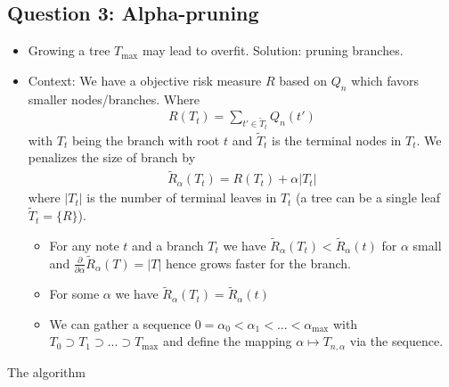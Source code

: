 \documentclass[a4paper,12pt,openany]{book}
\providecommand{\tightlist}{%
 \setlength{\itemsep}{0pt}\setlength{\parskip}{0pt}}
\begin{document}
\hypertarget{question-3-alpha-pruning}{%
\subsection{Question 3: Alpha-pruning}\label{question-3-alpha-pruning}}

\begin{itemize}
\tightlist
\item
  Growing a tree \(T_{\max}\) may lead to overfit. Solution: pruning branches.
\item
  Context: We have a objective risk measure \(R\) based on \(Q_n\) which favors smaller nodes/branches. Where
  \begin{align*}
    R(T_t)=\sum_{t'\in \tilde T_t}Q_n(t')
    \end{align*}
  with \(T_t\) being the branch with root \(t\) and \(\tilde T_t\) is the terminal nodes in \(T_t\). We penalizes the size of branch by
  \begin{align*}
    \widetilde R_\alpha(T_t)=R(T_t)+\alpha \vert T_t\vert
    \end{align*}
  where \(\vert T_t\vert\) is the number of terminal leaves in \(T_t\) (a tree can be a single leaf \(\tilde T_t=\{R\}\)).

  \begin{itemize}
  \tightlist
  \item
    For any note \(t\) and a branch \(T_t\) we have \(\widetilde R_\alpha(T_t)<\widetilde R_\alpha(t)\) for \(\alpha\) small and \(\frac{\partial}{\partial \alpha}\widetilde R_\alpha(T)=\vert T\vert\) hence grows faster for the branch.
  \item
    For some \(\alpha\) we have \(\widetilde R_\alpha(T_t)=\widetilde R_\alpha(t)\)
  \item
    We can gather a sequence \(0=\alpha_0<\alpha_1<...<\alpha_{\max}\) with \(T_0\supset T_1\supset ... \supset T_{\max}\) and define the mapping \(\alpha \mapsto T_{n,\alpha}\) via the sequence.
  \end{itemize}
\end{itemize}

The algorithm
\end{document}
